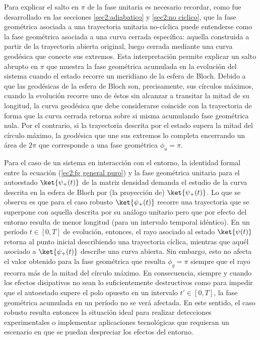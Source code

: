 Para explicar el salto en $\pi$ de la fase unitaria es necesario recordar, como fue desarrollado en las secciones \ref{sec2:adiabatico} y \ref{sec2:no ciclico}, que la fase geométrica asociada a una trayectoria unitaria no-cíclica puede entenderse como la fase geométrica asociada a una curva cerrada específica: aquella construida a partir de la trayectoria abierta original, luego cerrada mediante una curva geodésica que conecte sus extremos. Esta interpretación permite explicar un salto abrupto en $\pi$ que muestra la fase geométrica acumulada en la evolución del sistema cuando el estado recorre un meridiano de la esfera de Bloch. Debido a que las geodésicas de la esfera de Bloch son, precisamente, sus círculos máximos, cuando la evolución recorre uno de éstos sin alcanzar a transitar la mitad de su longitud, la curva geodésica que debe considerarse coincide con la trayectoria de forma que la curva cerrada retorna sobre si misma acumulando fase geométrica nula. Por el contrario, si la trayectoria descrita por el estado supera la mitad del círculo máximo, la geodésica que une sus extremos lo completa encerrando un área de $2\pi$ que corresponde a una fase geométrica $\phi_u=\pi$.

Para el caso de un sistema en interacción con el entorno, la identidad formal entre la ecuación (\ref{ec2:fg general puro}) y la fase geométrica unitaria para el autoestado $\ket{\psi_+(t)}$ de la matriz densidad demanda el estudio de la curva descrita en la esfera de Bloch por (la proyección de) $\ket{\psi_+(t)}$. Lo que se observa es que para el caso robusto $\ket{\psi_+(t)}$ recorre una trayectoria que se superpone con aquella descrita por su análogo unitario pero que por efecto del entorno resulta de menor longitud (para un intervalo temporal idéntico). En un período $t \in [0, T]$ de evolución, entonces, el rayo asociado al estado $\ket{\psi(t)}$ retorna al punto inicial describiendo una trayectoria cíclica, mientras que aquél asociado a $\ket{\psi_+(t)}$ describe una curva abierta. Sin embargo, esto no afecta el valor obtenido para la fase geométrica que resulta $\phi_g=\pi$ siempre que el rayo recorra más de la mitad del círculo máximo. En consecuencia, siempre y cuando los efectos disipativos no sean lo suficientemente destructivos como para impedir que el autoestado supere el polo opuesto en un intervalo $t' \in [0, T]$, la fase geométrica acumulada en un período no se verá afectada. En este sentido, el caso robusto resulta entonces la situación ideal para realizar detecciones experimentales o implementar aplicaciones tecnológicas que requieran un escenario en que se puedan despreciar los efectos del entorno.

